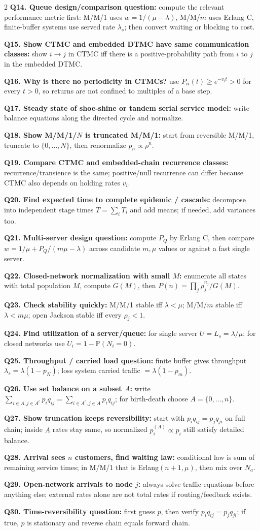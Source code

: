 \documentclass[10pt,fleqn]{article}
\newcommand{\PP}{\mathbb{P}}
\newcommand{\qa}[2]{\textbf{#1} #2\par}
\begin{document}
\begin{multicols*}{2}
\qa{Q14. Queue design/comparison question:}{compute the relevant performance metric first: M/M/1 uses \(w=1/(\mu-\lambda)\), M/M/\(m\) uses Erlang C, finite-buffer systems use served rate \(\lambda_s\); then convert waiting or blocking to cost.}
\qa{Q15. Show CTMC and embedded DTMC have same communication classes:}{show \(i\to j\) in CTMC iff there is a positive-probability path from \(i\) to \(j\) in the embedded DTMC.}
\qa{Q16. Why is there no periodicity in CTMCs?}{use \(P_{ii}(t)\ge e^{-v_it}>0\) for every \(t>0\), so returns are not confined to multiples of a base step.}
\qa{Q17. Steady state of shoe-shine or tandem serial service model:}{write balance equations along the directed cycle and normalize.}
\qa{Q18. Show M/M/1/\(N\) is truncated M/M/1:}{start from reversible M/M/1, truncate to \(\{0,\dots,N\}\), then renormalize \(p_n\propto \rho^n\).}
\qa{Q19. Compare CTMC and embedded-chain recurrence classes:}{recurrence/transience is the same; positive/null recurrence can differ because CTMC also depends on holding rates \(v_i\).}
\qa{Q20. Find expected time to complete epidemic / cascade:}{decompose into independent stage times \(T=\sum_iT_i\) and add means; if needed, add variances too.}
\qa{Q21. Multi-server design question:}{compute \(P_Q\) by Erlang C, then compare \(w=1/\mu+P_Q/(m\mu-\lambda)\) across candidate \(m,\mu\) values or against a fast single server.}
\qa{Q22. Closed-network normalization with small \(M\):}{enumerate all states with total population \(M\), compute \(G(M)\), then \(P(n)=\prod_j\rho_j^{n_j}/G(M)\).}
\qa{Q23. Check stability quickly:}{M/M/1 stable iff \(\lambda<\mu\); M/M/\(m\) stable iff \(\lambda<m\mu\); open Jackson stable iff every \(\rho_j<1\).}
\qa{Q24. Find utilization of a server/queue:}{for single server \(U=L_s=\lambda/\mu\); for closed networks use \(U_i=1-\PP(N_i=0)\).}
\qa{Q25. Throughput / carried load question:}{finite buffer gives throughput \(\lambda_s=\lambda(1-p_N)\); loss system carried traffic \(=\lambda(1-p_m)\).}
\qa{Q26. Use set balance on a subset \(A\):}{write \(\sum_{i\in A,j\in A^c}p_iq_{ij}=\sum_{i\in A^c,j\in A}p_iq_{ij}\); for birth-death choose \(A=\{0,\dots,n\}\).}
\qa{Q27. Show truncation keeps reversibility:}{start with \(p_iq_{ij}=p_jq_{ji}\) on full chain; inside \(A\) rates stay same, so normalized \(p_i^{(A)}\propto p_i\) still satisfy detailed balance.}
\qa{Q28. Arrival sees \(n\) customers, find waiting law:}{conditional law is sum of remaining service times; in M/M/1 that is Erlang\((n+1,\mu)\), then mix over \(N_a\).}
\qa{Q29. Open-network arrivals to node \(j\):}{always solve traffic equations before anything else; external rates alone are not total rates if routing/feedback exists.}
\qa{Q30. Time-reversibility question:}{first guess \(p\), then verify \(p_iq_{ij}=p_jq_{ji}\); if true, \(p\) is stationary and reverse chain equals forward chain.}


\end{multicols*}
\end{document}
